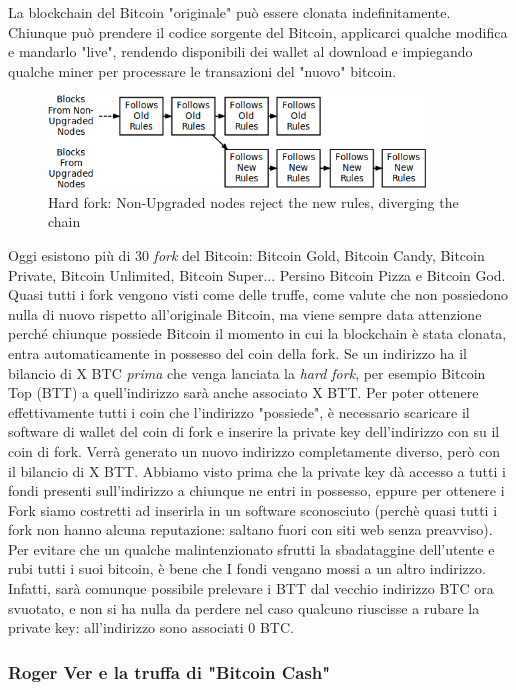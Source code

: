 \documentclass {article}
\begin{document}
{La blockchain del Bitcoin "originale" può essere clonata indefinitamente. Chiunque può prendere il codice sorgente del Bitcoin, applicarci qualche modifica e mandarlo "live", rendendo disponibili dei wallet al download e impiegando qualche miner per processare le transazioni del "nuovo" bitcoin.

\vspace {0.5cm}
\begin{figure}[h]
\includegraphics [width = 10cm] {hard_fork.png}
\centering
\caption {Hard fork: Non-Upgraded nodes reject the new rules, diverging the chain}
\end{figure}
\vspace {0.2cm}
\noindent
%
Oggi esistono più di 30 \textit{fork} del Bitcoin: Bitcoin Gold, Bitcoin Candy, Bitcoin Private, Bitcoin Unlimited, Bitcoin Super... Persino Bitcoin Pizza e Bitcoin God.
Quasi tutti i fork vengono visti come delle truffe, come valute che non possiedono nulla di nuovo rispetto all'originale Bitcoin, ma viene sempre data attenzione perché chiunque possiede Bitcoin il momento in cui la blockchain è stata clonata, entra automaticamente in possesso del coin della fork.
Se un indirizzo ha il bilancio di X BTC \emph{prima} che venga lanciata la \textit{hard fork}, per esempio Bitcoin Top (BTT) a quell'indirizzo sarà anche associato X BTT.
Per poter ottenere effettivamente tutti i coin che l'indirizzo "possiede", è necessario scaricare il software di wallet del coin di fork e inserire la private key dell'indirizzo con su il coin di fork.
Verrà generato un nuovo indirizzo completamente diverso, però con il bilancio di X BTT.
Abbiamo visto prima che la private key dà accesso a tutti i fondi presenti sull'indirizzo a chiunque ne entri in possesso, eppure per ottenere i Fork siamo costretti ad inserirla in un software sconosciuto (perchè quasi tutti i fork non hanno alcuna reputazione: saltano fuori con siti web senza preavviso).
Per evitare che un qualche malintenzionato sfrutti la sbadataggine dell'utente e rubi tutti i suoi bitcoin, è bene che I fondi vengano mossi a un altro indirizzo.
Infatti, sarà comunque possibile prelevare i BTT dal vecchio indirizzo BTC ora svuotato, e non si ha nulla da perdere nel caso qualcuno riuscisse a rubare la private key: all'indirizzo sono associati 0 BTC.


\subsubsection {Roger Ver e la truffa di "Bitcoin Cash"}


}
\end{document}
